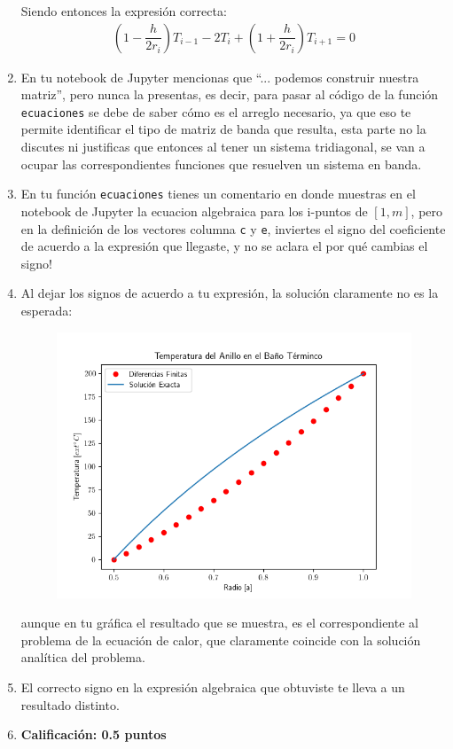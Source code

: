 \begin{enumerate}
Siendo entonces la expresión correcta:
\begin{align*}
\left( 1 - \dfrac{h}{2 r_{i}} \right) T_{i-1} - 2 T_{i} + \left( 1 + \dfrac{h}{2 r_{i}} \right) T_{i+1} = 0
\end{align*}
\item En tu notebook de Jupyter mencionas que \enquote{... podemos construir nuestra matriz}, pero nunca la presentas, es decir, para pasar al código de la función \texttt{ecuaciones} se debe de saber cómo es el arreglo necesario, ya que eso te permite identificar el tipo de matriz de banda que resulta, esta parte no la discutes ni justificas que entonces al tener un sistema tridiagonal, se van a ocupar las correspondientes funciones que resuelven un sistema en banda.
\item En tu función \texttt{ecuaciones} tienes un comentario en donde muestras en el notebook de Jupyter la ecuacion algebraica para los i-puntos de $[1, m]$, pero en la definición de los vectores columna \texttt{c} y \texttt{e}, inviertes el signo del coeficiente de acuerdo a la expresión que llegaste, y no se aclara el por qué cambias el signo! 
\item Al dejar los signos de acuerdo a tu expresión, la solución claramente no es la esperada:
\begin{figure}[H]
    \centering
    \includegraphics[scale=0.8]{Evidencia_02_05_00b_Antonio.png}
\end{figure}
aunque en tu gráfica el resultado que se muestra, es el correspondiente al problema de la ecuación de calor, que claramente coincide con la solución analítica del problema.
\item El correcto signo en la expresión algebraica que obtuviste te lleva a un resultado distinto.
\item \textbf{Calificación: 0.5 puntos}
\end{enumerate}

